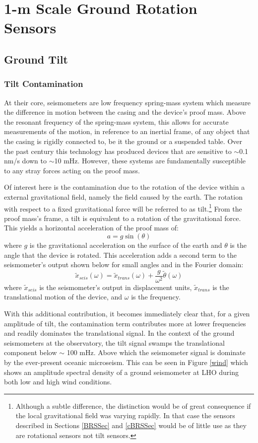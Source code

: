 \documentclass [12pt, proquest]{uwthesis}[2019]
\begin{document}
\chapter{1-m Scale Ground Rotation Sensors} \label{BRS_chap}
\section{Ground Tilt}\label{tilt}
\subsection{Tilt Contamination}\label{tiltCon}
\quad At their core, seismometers are low frequency spring-mass system which measure the difference in motion between the casing and the device's proof mass. Above the resonant frequency of the spring-mass system, this allows for accurate measurements of the motion, in reference to an inertial frame, of any object that the casing is rigidly connected to, be it the ground or a suspended table. Over the past century this technology has produced devices that are sensitive to $\sim$0.1 nm/s down to $\sim$10 mHz. However, these systems are fundamentally susceptible to any stray forces acting on the proof mass.

Of interest here is the contamination due to the rotation of the device within a external gravitational field, namely the field caused by the earth. The rotation with respect to a fixed gravitational force will be referred to as tilt.\footnote{Although a subtle difference, the distinction would be of great consequence if the local gravitational field was varying rapidly. In that case the sensors described in Sections \ref{BRSSec} and \ref{cBRSSec} would be of little use as they are rotational sensors not tilt sensors.} From the proof mass's frame, a tilt is equivalent to a rotation of the gravitational force. This yields a horizontal acceleration of the proof mass of:
\[ a=g \sin(\theta)\]
where $g$ is the gravitational acceleration on the surface of the earth and $\theta$ is the angle that the device is rotated. This acceleration adds a second term to the seismometer's output shown below for small angles and in the Fourier domain:
\[\tilde{x}_{seis}(\omega)=\tilde{x}_{trans}(\omega)+\frac{g}{\omega^2}\tilde{\theta}(\omega)\]
where $\tilde{x}_{seis}$ is the seismometer's output in displacement units, $\tilde{x}_{trans}$ is the translational motion of the device, and $\omega$ is the frequency. 

With this additional contribution, it becomes immediately clear that, for a given amplitude of tilt, the contamination term contributes more at lower frequencies and readily dominates the translational signal. In the context of the ground seismometers at the observatory, the tilt signal swamps the translational component below $\sim$ 100 mHz. Above which the seismometer signal is dominate by the ever-present oceanic microseism. This can be seen in Figure \ref{wind} which shows an amplitude spectral density of a ground seismometer at LHO during both low and high wind conditions.
\end{document}

